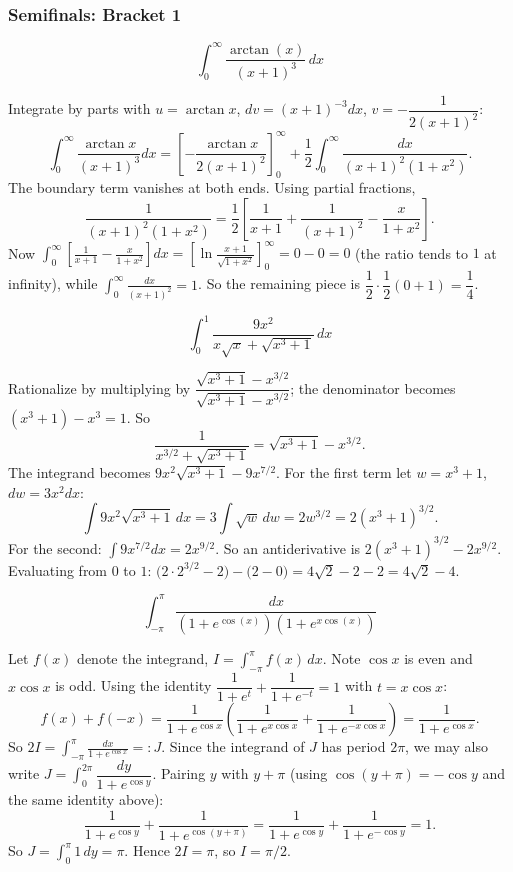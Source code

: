 \subsubsection*{Semifinals: Bracket 1}
\begin{questions}

\question \[\int_0^\infty \frac{\arctan(x)}{(x+1)^3}\,dx\]
\begin{solution}
Integrate by parts with $u=\arctan x$, $dv=(x+1)^{-3}dx$, $v=-\dfrac{1}{2(x+1)^2}$:
\[
\int_0^\infty \frac{\arctan x}{(x+1)^3}dx=\left[-\frac{\arctan x}{2(x+1)^2}\right]_0^\infty+\frac12\int_0^\infty \frac{dx}{(x+1)^2(1+x^2)}.
\]
The boundary term vanishes at both ends. Using partial fractions,
\[
\frac{1}{(x+1)^2(1+x^2)}=\frac12\left[\frac{1}{x+1}+\frac{1}{(x+1)^2}-\frac{x}{1+x^2}\right].
\]
Now $\displaystyle\int_0^\infty\left[\frac1{x+1}-\frac{x}{1+x^2}\right]dx=\left[\ln\frac{x+1}{\sqrt{1+x^2}}\right]_0^\infty=0-0=0$ (the ratio tends to $1$ at infinity), while $\displaystyle\int_0^\infty\frac{dx}{(x+1)^2}=1$.
So the remaining piece is $\dfrac12\cdot\dfrac12(0+1)=\dfrac14$.
\end{solution}

\question \[\int_0^1 \frac{9x^2}{x\sqrt{x}+\sqrt{x^3+1}}\,dx\]
\begin{solution}
Rationalize by multiplying by $\dfrac{\sqrt{x^3+1}-x^{3/2}}{\sqrt{x^3+1}-x^{3/2}}$; the denominator becomes $(x^3+1)-x^3=1$. So
\[
\frac{1}{x^{3/2}+\sqrt{x^3+1}}=\sqrt{x^3+1}-x^{3/2}.
\]
The integrand becomes $9x^2\sqrt{x^3+1}-9x^{7/2}$. For the first term let $w=x^3+1$, $dw=3x^2dx$:
\[
\int 9x^2\sqrt{x^3+1}\,dx=3\int\sqrt w\,dw=2w^{3/2}=2(x^3+1)^{3/2}.
\]
For the second: $\displaystyle\int 9x^{7/2}dx=2x^{9/2}$. So an antiderivative is $2(x^3+1)^{3/2}-2x^{9/2}$.
Evaluating from $0$ to $1$: $\big(2\cdot2^{3/2}-2\big)-\big(2-0\big)=4\sqrt2-2-2=4\sqrt2-4$.
\end{solution}

\question \[\int_{-\pi}^\pi \frac{dx}{(1+e^{\cos(x)})(1+e^{x\cos(x)})}\]
\begin{solution}
Let $f(x)$ denote the integrand, $I=\int_{-\pi}^\pi f(x)\,dx$. Note $\cos x$ is even and $x\cos x$ is odd. Using the identity $\dfrac{1}{1+e^t}+\dfrac{1}{1+e^{-t}}=1$ with $t=x\cos x$:
\[
f(x)+f(-x)=\frac{1}{1+e^{\cos x}}\left(\frac{1}{1+e^{x\cos x}}+\frac{1}{1+e^{-x\cos x}}\right)=\frac{1}{1+e^{\cos x}}.
\]
So $2I=\displaystyle\int_{-\pi}^\pi \frac{dx}{1+e^{\cos x}}=:J$.
Since the integrand of $J$ has period $2\pi$, we may also write $J=\int_0^{2\pi}\dfrac{dy}{1+e^{\cos y}}$. Pairing $y$ with $y+\pi$ (using $\cos(y+\pi)=-\cos y$ and the same identity above):
\[
\frac{1}{1+e^{\cos y}}+\frac{1}{1+e^{\cos(y+\pi)}}=\frac{1}{1+e^{\cos y}}+\frac{1}{1+e^{-\cos y}}=1.
\]
So $J=\displaystyle\int_0^\pi 1\,dy=\pi$. Hence $2I=\pi$, so $I=\pi/2$.
\end{solution}

\end{questions}

